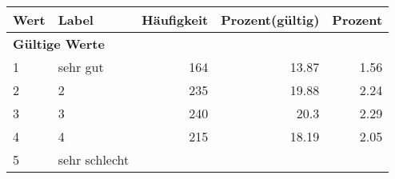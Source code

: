      \begin{longtable}{lXrrr}
     \toprule
     \textbf{Wert} & \textbf{Label} & \textbf{Häufigkeit} & \textbf{Prozent(gültig)} & \textbf{Prozent} \\
     \endhead
     \midrule
     \multicolumn{5}{l}{\textbf{Gültige Werte}}\\

     1 &
     \multicolumn{1}{X}{ sehr gut   } &


       \num{164} &
       \num[round-mode=places,round-precision=2]{13,87} &
         \num[round-mode=places,round-precision=2]{1,56} \\

     2 &
     \multicolumn{1}{X}{ 2   } &


       \num{235} &
       \num[round-mode=places,round-precision=2]{19,88} &
         \num[round-mode=places,round-precision=2]{2,24} \\

     3 &
     \multicolumn{1}{X}{ 3   } &


       \num{240} &
       \num[round-mode=places,round-precision=2]{20,3} &
         \num[round-mode=places,round-precision=2]{2,29} \\

     4 &
     \multicolumn{1}{X}{ 4   } &


       \num{215} &
       \num[round-mode=places,round-precision=2]{18,19} &
         \num[round-mode=places,round-precision=2]{2,05} \\

     5 &
     \multicolumn{1}{X}{ sehr schlecht   } &



\end{longtable}
